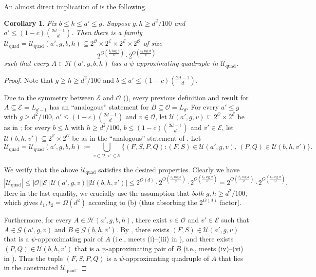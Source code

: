 \documentclass{amsart}
\newtheorem{cor}[thm]{Corollary}
\theoremstyle{definition}
\newcommand{\cO}{\mathcal{O} }
\newcommand{\cE}{\mathcal{E} }
\newcommand{\cG}{\mathcal{G} }
\newcommand{\cH}{\mathcal{H} }
\newcommand{\cU}{\mathcal{U} }
\newcommand{\qd}{\mathrm{quad}}
\newcommand{\0}[0]{\emptyset}
\begin{document}
An almost direct implication of  is the following.
\begin{cor}\label{cor:psi-approx-quad}
Fix $b\leq h\leq a'\leq g$. Suppose $g,h\geq d^2/100$ and $a'\leq (1-c)\binom{2d-1}{d}$.
Then there is a family $\mathcal U_{\qd}=\cU_\qd(a',g,b,h)\subseteq 2^{\cO}\times 2^{\cE}\times 2^{\cE}\times 2^{\cO}$ of size
    \[
    2^{O\left(\frac{t_1\log d}{\psi}\right)}\cdot 2^{O\left(\frac{t_2\log d}{\psi}\right)}
    \]
    such that every $A\in\cH(a',g,b,h)$ has a $\psi$-approximating quadruple in $\mathcal U_{\qd}$.
\end{cor}
\begin{proof}
Note that $g\geq h\geq d^2/100$ and $b\leq a'\leq (1-c)\binom{2d-1}{d}$. 

Due to the symmetry between $\cE$ and $\cO$ (), every previous definition and result for $A\subseteq \cE=L_{d-1}$ has an ``analogous'' statement for $B\subseteq \cO=L_d$. For every $a'\leq g$ with $g\geq d^2/100$, $a'\leq (1-c)\binom{2d-1}{d}$ and $v\in \cO$, let $\cU(a',g,v)\subseteq 2^{\cO}\times 2^{\cE}$ be as in ; for every $b\leq h$ with $h\geq d^2/100$, $b\leq (1-c)\binom{2d-1}{d}$ and $v'\in\cE$, let $\cU(b,h,v')\subseteq 2^{\cE}\times 2^{\cO}$ be as in the ``analogous'' statement of .
Let
\[
\cU_{\qd}=\cU_{\qd}(a',g,b,h):=\bigcup_{v\in \cO,\, v'\in\cE}\{(F,S,P,Q):(F,S)\in \cU(a',g,v),\, (P,Q)\in \cU(b,h,v')\}.
\]

We verify that the above $\cU_{\qd}$ satisfies the desired properties. Clearly we have 
\[
|\cU_{\qd}|\leq |\cO||\cE||\cU(a',g,v)||\cU(b,h,v')|\leq 2^{O(d)}\cdot 2^{O\left(\frac{t_1\log d}{\psi}\right)}\cdot 2^{O\left(\frac{t_2\log d}{\psi}\right)} = 2^{O\left(\frac{t_1\log d}{\psi}\right)}\cdot 2^{O\left(\frac{t_2\log d}{\psi}\right)}.
\]
Here in the last equality, we crucially use the assumption that \textit{both} $g,h\geq d^2/100$, which gives $t_1,t_2=\Omega(d^2)$ according to (b) (thus absorbing the $2^{O(d)}$ factor).

Furthermore, for every $A\in\cH(a',g,b,h)$, there exist $v\in\cO$ and $v'\in\cE$ such that $A\in\cG(a',g,v)$ and $B\in\cG(b,h,v')$. By , there exists $(F,S)\in\cU(a',g,v)$ that is a $\psi$-approximating pair of $A$ (i.e., meets (i)--(iii) in ), and there exists $(P,Q)\in\cU(b,h,v')$ that is a $\psi$-approximating pair of $B$ (i.e., meets (iv)--(vi) in ). Thus the tuple $(F,S,P,Q)$ is a $\psi$-approximating quadruple of $A$ that lies in the constructed $\cU_{\qd}$.
\end{proof}
\end{document}
